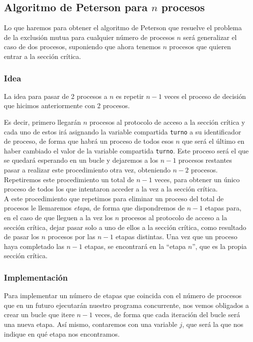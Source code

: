 \subsection{Algoritmo de Peterson para $n$ procesos}
Lo que haremos para obtener el algoritmo de Peterson que resuelve el problema de la exclusión mutua para cualquier número de procesos $n$ será generalizar el caso de dos procesos, suponiendo que ahora tenemos $n$ procesos que quieren entrar a la sección crítica.

\subsubsection{Idea}
La idea para pasar de 2 procesos a $n$ es repetir $n-1$ veces el proceso de decisión que hicimos anteriormente con 2 procesos. 

Es decir, primero llegarán $n$ procesos al protocolo de acceso a la sección crítica y cada uno de estos irá asignando la variable compartida \verb|turno| a su identificador de proceso, de forma que habrá un proceso de todos esos $n$ que será el último en haber cambiado el valor de la variable compartida \verb|turno|. Este proceso será el que se quedará esperando en un bucle y dejaremos a los $n-1$ procesos restantes pasar a realizar este procedimiento otra vez, obteniendo $n-2$ procesos. Repetiremos este procedimiento un total de $n-1$ veces, para obtener un único proceso de todos los que intentaron acceder a la vez a la sección crítica.\\

A este procedimiento que repetimos para eliminar un proceso del total de procesos le llemaremos \textit{etapa}, de forma que dispondremos de $n-1$ etapas para, en el caso de que lleguen a la vez los $n$ procesos al protocolo de acceso a la sección crítica, dejar pasar solo a uno de ellos a la sección crítica, como resultado de pasar los $n$ procesos por las $n-1$ etapas distintas. Una vez que un proceso haya completado las $n-1$ etapas, se encontrará en la ``etapa $n$'', que es la propia sección crítica.

\subsubsection{Implementación}
Para implementar un número de etapas que coincida con el número de procesos que en un futuro ejecutarán nuestro programa concurrente, nos vemos obligados a crear un bucle que itere $n-1$ veces, de forma que cada iteración del bucle será una nueva etapa. Así mismo, contaremos con una variable $j$, que será la que nos indique en qué etapa nos encontramos.

